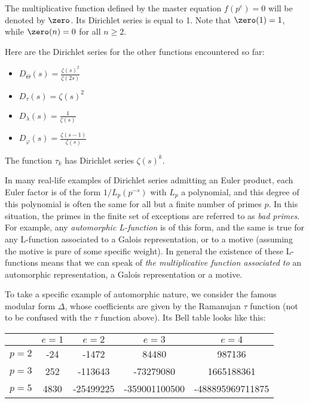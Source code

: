 \documentclass[a4paper]{article}
\begin{document}
\begin{example}
The multiplicative function defined by the master equation $f(p^e) = 0$ will be denoted by $\zero$. Its Dirichlet series is equal to 1. Note that $\zero(1) = 1$, while $\zero(n) = 0$ for all $n \geq 2$.
\end{example}

\begin{example}
Here are the Dirichlet series for the other functions encountered so far:
\begin{itemize}
\item $D_{\Theta}(s) = \frac{\zeta(s)^2}{\zeta(2s)}$
\item $D_{\tau}(s) = \zeta(s)^2$
\item $D_{\lambda}(s) = \frac{1}{\zeta(s)}$
\item $D_{\varphi}(s) = \frac{\zeta(s - 1)}{\zeta(s)}$
\end{itemize}
The function $\tau_k$ has Dirichlet series $\zeta(s)^k$.
\end{example}



\begin{example}
In many real-life examples of Dirichlet series admitting an Euler product, each Euler factor is of the form ${1} / {L_p(p^{-s})}$ with $L_p$ a polynomial, and this degree of this polynomial is often the same for all but a finite number of primes $p$. In this situation, the primes in the finite set of exceptions are referred to as \emph{bad primes}. For example, any \emph{automorphic L-function} is of this form, and the same is true for any L-function associated to a Galois representation, or to a motive (assuming the motive is pure of some specific weight). In general the existence of these L-functions means that we can speak of \emph{the multiplicative function associated to} an automorphic representation, a Galois representation or a motive.
\end{example}

\begin{example}
To take a specific example of automorphic nature, we consider the famous modular form $\Delta$, whose coefficients are given by the Ramanujan $\tau$ function (not to be confused with the $\tau$ function above). Its Bell table looks like this:
\vskip10pt
\begin{center}
\begin{tabular}{| l | | c | c | c | c |}
\hline
& $e = 1$ & $e = 2$ & $e = 3$ & $e = 4$ \\
\hline
\hline
$p = 2$ & -24 & -1472 & 84480 & 987136 \\
\hline
$p = 3$ & 252 & -113643 & -73279080 & 1665188361 \\
\hline
$p = 5$ & 4830 & -25499225 & -359001100500 & -488895969711875 \\
\hline
\end{tabular}
\end{center}



\end{example}
\end{document}
